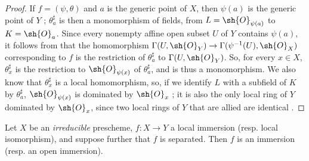 \begin{proof}
If $f=(\psi,\theta)$ and $a$ is the generic point of $X$, then $\psi(a)$ is the generic point of $Y$ ;
$\theta_a^\sharp$ is then a monomorphism of fields, from $L=\sh{O}_{\psi(a)}$ to $K=\sh{O}_a$.
Since every nonempty affine open subset $U$ of $Y$ contains $\psi(a)$, it follows from  that the homomorphism $\Gamma(U,\sh{O}_Y)\to\Gamma(\psi^{-1}(U),\sh{O}_X)$ corresponding to $f$ is the restriction of $\theta_a^\sharp$ to $\Gamma(U,\sh{O}_Y)$.
So, for every $x\in X$, $\theta_x^\sharp$ is the restriction to $\sh{O}_{\psi(x)}$ of $\theta_a^\sharp$, and is thus a monomorphism.
We also know that $\theta_x^\sharp$ is a local homomorphism, so, if we identify $L$ with a subfield of $K$ by $\theta_a^\sharp$, $\sh{O}_{\psi(x)}$ is dominated by $\sh{O}_x$ ;
it is also the only local ring of $Y$ dominated by $\sh{O}_x$, since two local rings of $Y$ that are allied are identical .
\end{proof}

\begin{proposition}[8.2.8]
\label{I.8.2.8}
Let $X$ be an \emph{irreducible} prescheme, $f:X\to Y$ a local immersion (resp. local isomorphism), and suppose further that $f$ is separated. Then $f$ is an immersion (resp. an open immersion).
\end{proposition}

